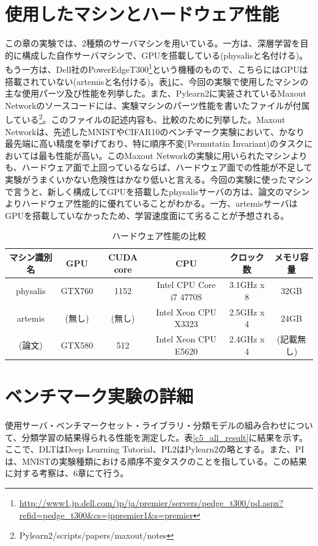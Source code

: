 \section{使用したマシンとハードウェア性能}
この章の実験では、2種類のサーバマシンを用いている。一方は、深層学習を目的に構成した自作サーバマシンで、GPUを搭載している(physalisと名付ける)。もう一方は、Dell社のPowerEdgeT300\footnote{\url{http://www1.jp.dell.com/jp/ja/premier/servers/pedge_t300/pd.aspx?refid=pedge_t300&cs=jppremier1&s=premier}}という機種のもので、こちらにはGPUは搭載されていない(artemisと名付ける)。表\ref{c5_hardware_spec}に、今回の実験で使用したマシンの主な使用パーツ及び性能を列挙した。また、Pylearn2に実装されているMaxout Networkのソースコードには、実験マシンのパーツ性能を書いたファイルが付属している\footnote{Pylearn2/scripts/papers/maxout/notes}。このファイルの記述内容も、比較のために列挙した。Maxout Networkは、先述したMNISTやCIFAR10のベンチマーク実験において、かなり最先端に高い精度を挙げており、特に順序不変(Permutatin Invariant)のタスクにおいては最も性能が高い。このMaxout Networkの実験に用いられたマシンよりも、ハードウェア面で上回っているならば、ハードウェア面での性能が不足して実験がうまくいかない危険性はかなり低いと言える。今回の実験に使ったマシンで言うと、新しく構成してGPUを搭載したphysalisサーバの方は、論文のマシンよりハードウェア性能的に優れていることがわかる。一方、artemisサーバはGPUを搭載していなかったため、学習速度面にて劣ることが予想される。
\begin{table}[tbp]
 \begin{center}
  \caption{ハードウェア性能の比較}
  \begin{tabular}{|c|c|c|c|c|c|}\hline
  マシン識別名 & GPU & CUDA core & CPU & クロック数 & メモリ容量\\ \hline
physalis & GTX760 & 1152 & Intel CPU Core i7 4770S & 3.1GHz x 8 & 32GB\\ \hline
artemis & (無し) & (無し) & Intel Xeon CPU X3323 & 2.5GHz x 4 & 24GB\\ \hline
(論文) &GTX580 & 512 & Intel Xeon CPU E5620 &  2.4GHz x 4 & (記載無し)\\ \hline
  \end{tabular}
 \end{center}

 \label{c5_hardware_spec}
\end{table}

\section{ベンチマーク実験の詳細}
使用サーバ・ベンチマークセット・ライブラリ・分類モデルの組み合わせについて、分類学習の結果得られる性能を測定した。表\ref{c5_all_result}に結果を示す。ここで、DLTはDeep Learning Tutorial、PL2はPylearn2の略とする。また、PIは、MNISTの実験種類における順序不変タスクのことを指している。この結果に対する考察は、6章にて行う。


